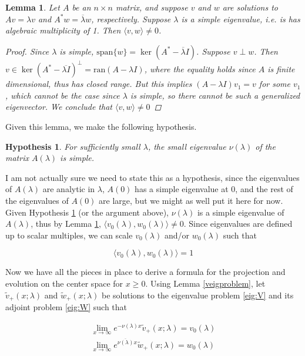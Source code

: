 \documentclass[12pt]{article}
\newtheorem{lemma}{Lemma}
\newtheorem{hypothesis}{Hypothesis}
\begin{document}
\begin{lemma}\label{perpeigs}
Let $A$ be an $n \times n$ matrix, and suppose $v$ and $w$ are solutions to $Av = \lambda v$ and $A^*w = \overline{\lambda}w$, respectively. Suppose $\lambda$ is a simple eigenvalue, i.e. is has algebraic multiplicity of 1. Then $\langle v, w \rangle \neq 0$.
\begin{proof}
Since $\lambda$ is simple, $\text{span} \{w\} = \ker(A^* - \overline{\lambda}I)$. Suppose $v \perp w$. Then $v \in \ker(A^* - \overline{\lambda I})^\perp = \text{ran}(A - \lambda I)$, where the equality holds since $A$ is finite dimensional, thus has closed range. But this implies $(A - \lambda I)v_1 = v$ for some $v_1$, which cannot be the case since $\lambda$ is simple, so there cannot be such a generalized eigenvector. We conclude that $\langle v, w \rangle \neq 0$
\end{proof}
\end{lemma}

Given this lemma, we make the following hypothesis.

\begin{hypothesis}\label{simplesmalleig}
For sufficiently small $\lambda$, the small eigenvalue $\nu(\lambda)$ of the matrix $A(\lambda)$ is simple.
\end{hypothesis}

I am not actually sure we need to state this as a hypothesis, since the eigenvalues of $A(\lambda)$ are analytic in $\lambda$, $A(0)$ has a simple eigenvalue at 0, and the rest of the eigenvalues of $A(0)$ are large, but we might as well put it here for now.\\

Given Hypothesis \ref{simplesmalleig} (or the argument above), $\nu(\lambda)$ is a simple eigenvalue of $A(\lambda)$, thus by Lemma \ref{perpeigs}, $\langle v_0(\lambda), w_0(\lambda) \rangle \neq 0$. Since eigenvalues are defined up to scalar multiples, we can scale $v_0(\lambda)$ and/or $w_0(\lambda)$ such that

\[
\langle v_0(\lambda), w_0(\lambda) \rangle = 1
\]
 
Now we have all the pieces in place to derive a formula for the projection and evolution on the center space for $x \geq 0$. Using Lemma \ref{veigproblem}, let $\tilde{v}_+(x; \lambda)$ and $\tilde{w}_+(x; \lambda)$ be solutions to the eigenvalue problem \eqref{eig:V} and its adjoint problem \eqref{eig:W} such that

\begin{align*}
\lim_{x \rightarrow \infty} e^{-\nu(\lambda) x} \tilde{v}_+(x; \lambda) = v_0(\lambda) \\
\lim_{x \rightarrow \infty} e^{\overline{\nu(\lambda)} x} \tilde{w}_+(x; \lambda) = w_0(\lambda) \\
\end{align*}
\end{document}
